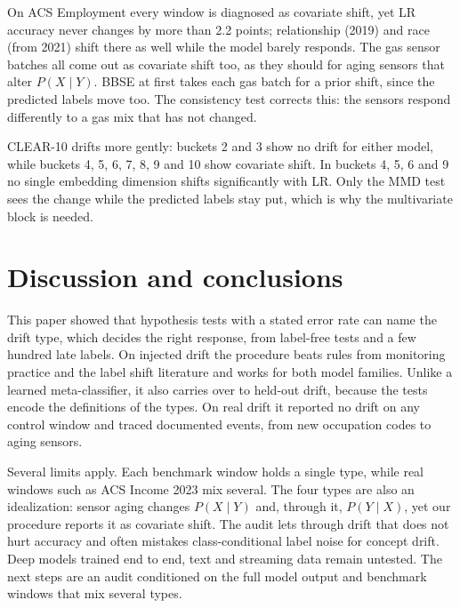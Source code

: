 \documentclass[pdflatex,sn-mathphys-num]{sn-jnl}
\begin{document}
On ACS Employment every window is diagnosed as covariate shift, yet LR accuracy never changes by more than 2.2 points; relationship (2019) and race (from 2021) shift there as well while the model barely responds. The gas sensor batches all come out as covariate shift too, as they should for aging sensors that alter $P(X\mid Y)$. BBSE at first takes each gas batch for a prior shift, since the predicted labels move too. The consistency test corrects this: the sensors respond differently to a gas mix that has not changed.

CLEAR-10 drifts more gently: buckets 2 and 3 show no drift for either model, while buckets 4, 5, 6, 7, 8, 9 and 10 show covariate shift. In buckets 4, 5, 6 and 9 no single embedding dimension shifts significantly with LR. Only the MMD test sees the change while the predicted labels stay put, which is why the multivariate block is needed.

\section{Discussion and conclusions}\label{sec:discussion}

This paper showed that hypothesis tests with a stated error rate can name the drift type, which decides the right response, from label-free tests and a few hundred late labels. On injected drift the procedure beats rules from monitoring practice and the label shift literature and works for both model families. Unlike a learned meta-classifier, it also carries over to held-out drift, because the tests encode the definitions of the types. On real drift it reported no drift on any control window and traced documented events, from new occupation codes to aging sensors.

Several limits apply. Each benchmark window holds a single type, while real windows such as ACS Income 2023 mix several. The four types are also an idealization: sensor aging changes $P(X\mid Y)$ and, through it, $P(Y\mid X)$, yet our procedure reports it as covariate shift. The audit lets through drift that does not hurt accuracy and often mistakes class-conditional label noise for concept drift. Deep models trained end to end, text and streaming data remain untested. The next steps are an audit conditioned on the full model output and benchmark windows that mix several types.


\end{document}
